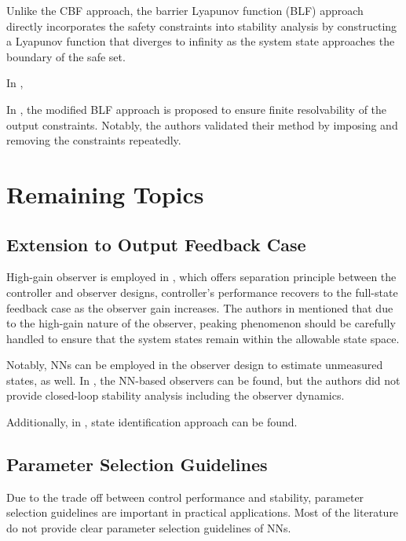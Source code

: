 Unlike the CBF approach, the barrier Lyapunov function (BLF) approach directly incorporates the safety constraints into stability analysis by constructing a Lyapunov function that diverges to infinity as the system state approaches the boundary of the safe set.

In \cite{Liu:2023aa}, 

In \cite{Zhao:2025aa}, the modified BLF approach is proposed to ensure finite resolvability of the output constraints.
Notably, the authors validated their method by imposing and removing the constraints repeatedly.

\section{Remaining Topics}

\subsection{Extension to Output Feedback Case}

High-gain observer \cite{Khalil:2002aa} is employed in \cite{Esfandiari:2015aa,He:2016aa}, which offers separation principle between the controller and observer designs, \ie controller's performance recovers to the full-state feedback case as the observer gain increases.
The authors in \cite{Esfandiari:2015aa} mentioned that due to the high-gain nature of the observer, peaking phenomenon should be carefully handled to ensure that the system states remain within the allowable state space.

\hfill

Notably, NNs can be employed in the observer design to estimate unmeasured states, as well.
In \cite{Zhao:2016aa}, the NN-based observers can be found, but the authors did not provide closed-loop stability analysis including the observer dynamics.

\hfill 

Additionally, in \cite{Esfandiari:2017aa}, state identification approach can be found.

\subsection{Parameter Selection Guidelines}

Due to the trade off between control performance and stability, parameter selection guidelines are important in practical applications.
Most of the literature do not provide clear parameter selection guidelines of NNs.

